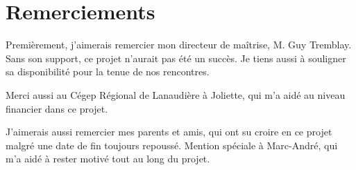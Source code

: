 \chapter*{Remerciements}

Premi\`erement, j'aimerais remercier mon directeur de ma\^itrise, M. Guy Tremblay.
Sans son support, ce projet n'aurait pas \'et\'e un succ\`es.
Je tiens aussi \`a souligner sa disponibilit\'e pour la tenue de nos rencontres.

Merci aussi au C\'egep R\'egional de Lanaudi\`ere \`a Joliette, qui m'a aid\'e au niveau financier dans ce projet.

J'aimerais aussi remercier mes parents et amis, qui ont su croire en ce projet malgr\'e une date de fin toujours repouss\'e.
Mention sp\'eciale \`a Marc-Andr\'e, qui m'a aid\'e \`a rester motiv\'e tout au long du projet.